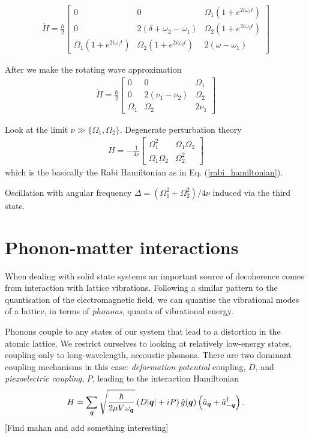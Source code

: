 \begin{align}
  \tilde{H}=\frac{\hbar}{2}
  \begin{bmatrix}
    0 & 0 & \Omega_1(1+e^{2i\omega_1 t}) \\
    0 & 2(\delta + \omega_2 - \omega_1) & \Omega_2 (1+e^{2i\omega_2 t}) \\
    \Omega_1(1+e^{2i\omega_1 t}) & \Omega_2 (1+e^{2i\omega_2 t}) & 2(\omega - \omega_1)
  \end{bmatrix}
\end{align}

After we make the rotating wave approximation
\begin{align}
  \tilde{H}=\frac{\hbar}{2}
  \begin{bmatrix}
    0 & 0 & \Omega_1 \\
    0 & 2(\nu_1 - \nu_2) & \Omega_2  \\
    \Omega_1 & \Omega_2  & 2\nu_1
  \end{bmatrix}
\end{align}

Look at the limit $\nu \gg \{\Omega_1, \Omega_2\}$.  Degenerate perturbation theory
\begin{align}
  H = -\frac{1}{4\nu}
  \begin{bmatrix}
    \Omega_1^2 & \Omega_1 \Omega_2 \\
    \Omega_1\Omega_2 & \Omega_2^2
  \end{bmatrix}
\end{align}
which is the basically the Rabi Hamiltonian as in Eq. (\ref{rabi_hamiltonian}).

Oscillation with angular frequency $\Delta = (\Omega_1^2 + \Omega_2^2)/4\nu$ induced via the third state.



\section{Phonon-matter interactions}

When dealing with solid state systems an important source of decoherence comes from interaction with lattice vibrations. Following a similar pattern to the quantisation of the electromagnetic field, we can quantise the vibrational modes of a lattice, in terms of \textit{phonons}, quanta of vibrational energy.

Phonons couple to any states of our system that lead to a distortion in the atomic lattice. We restrict ourselves to looking at relatively low-energy states, coupling only to long-wavelength, accoustic phonons. There are two dominant coupling mechanisms in this case: \textit{deformation potential} coupling, $D$, and \textit{piezoelectric coupling}, $P$, \cite{mahan} leading to the interaction Hamiltonian
\begin{align}
  H = \sum_{{\boldsymbol{q}}} \sqrt{\frac{\hbar}{2\mu V\omega_{{\boldsymbol{q}}}}} \left(D \vert {\boldsymbol{q}}\vert + iP \right)\hat{g}({\boldsymbol{q}})\left(\hat{a}_{{\boldsymbol{q}}} + \hat{a}^\dagger_{-{\boldsymbol{q}}} \right).
\end{align}
[Find mahan and add something interesting]

